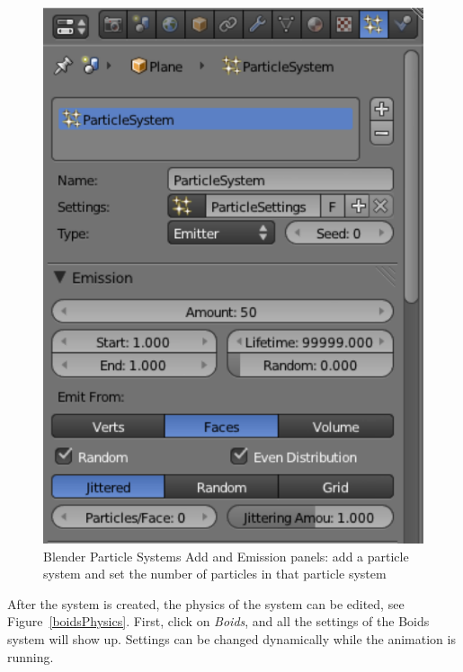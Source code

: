 \begin{figure}[htbp]
\begin{center}
\includegraphics[scale= 0.65]{figures/boidsCreatePS.pdf} 
\caption{Blender Particle Systems Add and Emission panels: add a particle system and set the number of particles in that particle system}
\label{boidsCreatePS}
\end{center}
\end{figure}

After the system is created, the physics of the system can be edited, see Figure~\ref{boidsPhysics}. First, click on \textit{Boids}, and all the settings of the Boids system will show up. Settings can be changed dynamically while the animation is running.

